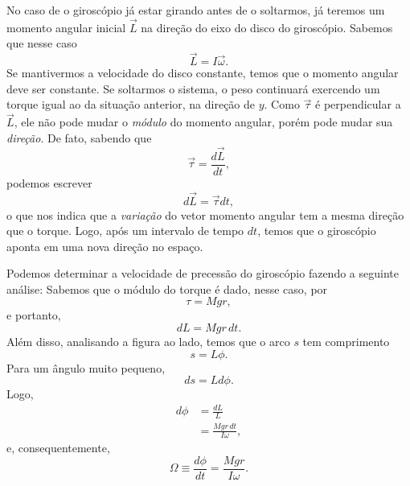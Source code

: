 No caso de o giroscópio já estar girando antes de o soltarmos, já teremos um momento angular inicial $\vec{L}$ na direção do eixo do disco do giroscópio. Sabemos que nesse caso 
\begin{equation}
  \vec{L} = I\vec{\omega}.
\end{equation}
%
Se mantivermos a velocidade do disco constante, temos que o momento angular deve ser constante. Se soltarmos o sistema, o peso continuará exercendo um torque igual ao da situação anterior, na direção de $y$. Como $\vec{\tau}$ é perpendicular a $\vec{L}$, ele não pode mudar o \emph{módulo} do momento angular, porém pode mudar sua \emph{direção}. De fato, sabendo que
\begin{equation}
  \vec{\tau} = \frac{d\vec{L}}{dt},
\end{equation}
%
podemos escrever
\begin{equation}
  d\vec{L} = \vec{\tau} dt,
\end{equation}
%
o que nos indica que a \emph{variação} do vetor momento angular tem a mesma direção que o torque. Logo, após um intervalo de tempo $dt$, temos que o giroscópio aponta em uma nova direção no espaço.

Podemos determinar a velocidade de precessão do giroscópio fazendo a seguinte análise: Sabemos que o módulo do torque é dado, nesse caso, por
\begin{equation}
  \tau = Mgr,
\end{equation}
%
e portanto,
\begin{equation}
  dL = Mgr\,dt.
\end{equation}
%
Além disso, analisando a figura ao lado, temos que o arco $s$ tem comprimento
\begin{equation}
  s = L \phi.
\end{equation}
%
Para um ângulo muito pequeno,
\begin{equation}
  ds = L d\phi.
\end{equation}
%
Logo,
\begin{align}
  d\phi &= \frac{dL}{L} \\
  &= \frac{Mgr\,dt}{I\omega},
\end{align}
%
e, consequentemente,
\begin{equation}
  \Omega \equiv \frac{d\phi}{dt} = \frac{Mgr}{I\omega}.
\end{equation}
